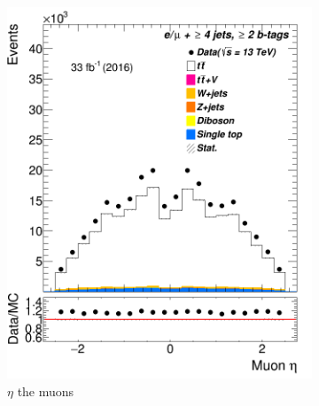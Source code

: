 \begin{figure} %
	\centering	


	\begin{subfigure}{0.25\textwidth}
	\includegraphics[width=\linewidth]{ControlPlots_emujets_2016_4incl_2incl/mu_eta_emujets_2016.png}
	\caption{$\eta$ the muons} \label{fig:Sec17}
\end{subfigure}\hspace*{0.5cm}
		\begin{subfigure}{0.25\textwidth}

\end{subfigure}
\end{figure}
